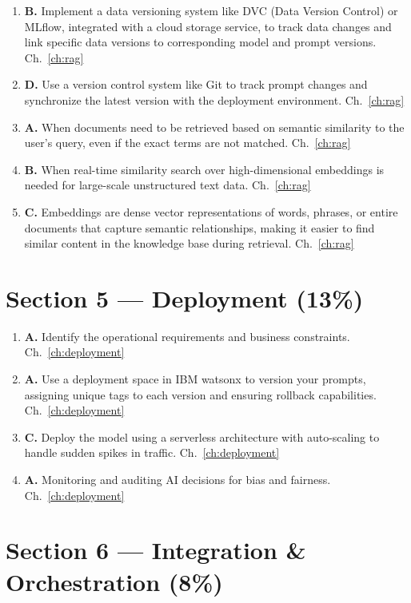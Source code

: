 \begin{enumerate}[resume,leftmargin=*]
  \item \textbf{B.} Implement a data versioning system like DVC (Data Version Control) or MLflow, integrated with a cloud storage service, to track data changes and link specific data versions to corresponding model and prompt versions. \hfill Ch.~\ref{ch:rag}
  \item \textbf{D.} Use a version control system like Git to track prompt changes and synchronize the latest version with the deployment environment. \hfill Ch.~\ref{ch:rag}
  \item \textbf{A.} When documents need to be retrieved based on semantic similarity to the user's query, even if the exact terms are not matched. \hfill Ch.~\ref{ch:rag}
  \item \textbf{B.} When real-time similarity search over high-dimensional embeddings is needed for large-scale unstructured text data. \hfill Ch.~\ref{ch:rag}
  \item \textbf{C.} Embeddings are dense vector representations of words, phrases, or entire documents that capture semantic relationships, making it easier to find similar content in the knowledge base during retrieval. \hfill Ch.~\ref{ch:rag}
\end{enumerate}

\section*{Section 5 --- Deployment (13\%)}

\begin{enumerate}[resume,leftmargin=*]
  \item \textbf{A.} Identify the operational requirements and business constraints. \hfill Ch.~\ref{ch:deployment}
  \item \textbf{A.} Use a deployment space in IBM watsonx to version your prompts, assigning unique tags to each version and ensuring rollback capabilities. \hfill Ch.~\ref{ch:deployment}
  \item \textbf{C.} Deploy the model using a serverless architecture with auto-scaling to handle sudden spikes in traffic. \hfill Ch.~\ref{ch:deployment}
  \item \textbf{A.} Monitoring and auditing AI decisions for bias and fairness. \hfill Ch.~\ref{ch:deployment}
\end{enumerate}

\section*{Section 6 --- Integration \& Orchestration (8\%)}

